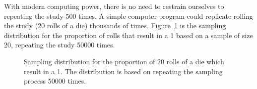 \documentclass[
  letterpaper,
  DIV=11,
  numbers=noendperiod]{scrreprt}
\theoremstyle{plain}
\theoremstyle{definition}
\theoremstyle{definition}
\theoremstyle{remark}
\begin{document}
With modern computing power, there is no need to restrain ourselves to
repeating the study 500 times. A simple computer program could replicate
rolling the study (20 rolls of a die) thousands of times.
Figure~\ref{fig-samplingdistns-dice-histogram} is the sampling
distribution for the proportion of rolls that result in a 1 based on a
sample of size 20, repeating the study 50000 times.

\begin{figure}


\caption{\label{fig-samplingdistns-dice-histogram}Sampling distribution
for the proportion of 20 rolls of a die which result in a 1. The
distribution is based on repeating the sampling process 50000 times.}

\end{figure}%
\end{document}
